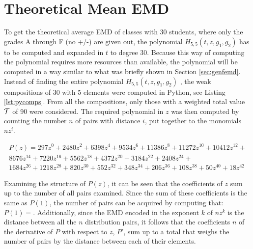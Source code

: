 \documentclass[12pt,letterpaper,oneside,openany]{book}
\begin{document}
\setcounter{section}{2}
\section{Theoretical Mean EMD}

To get the theoretical average EMD of classes with 30 students, where only the grades A through F  (no +/-) are given out, the polynomial $H_{5,5}(t, z, g_1, g_2)$ has to be computed and expanded in $t$ to degree 30. Because this way of computing the polynomial requires more resources than available, the polynomial will be computed in a way similar to what was briefly shown in Section \ref{sec:genfemd}.
Instead of finding the entire polynomial $H_{5,5}(t, z, g_1, g_2)$ , the weak compositions of 30 with 5 elements were computed in Python, see Listing \ref{lst:pycomps}. From all the compositions, only those with a weighted total value ${\mathcal{T}}$ of 90 were considered. The required polynomial in $z$ was then computed by counting the number $n$ of pairs with distance $i$, put together to the monomials $nz^i$.


\begin{multline*}
	P(z)=297z^{0}+2480z^{2}+6398z^{4}+9534z^{6}+11386z^{8}+11272z^{10}+10412z^{12}+\\8676z^{14}+7220z^{16}+5562z^{18}+4372z^{20}+3184z^{22}+2408z^{24}+\\1684z^{26}+1218z^{28}+820z^{30}+552z^{32}+348z^{34}+206z^{36}+108z^{38}+50z^{40}+18z^{42}
\end{multline*}

Examining the structure of $P(z)$, it can be seen that the coefficients of  $z$ sum up to the number of all pairs examined. Since the sum of these coefficients is the same as $P(1)$, the number of pairs can be acquired by computing that: $P(1)=$.
Additionally, since the EMD encoded in the exponent $k$ of $nz^k$ is the distance between all the $n$ distribution pairs, it follows that the coefficients $n$ of the derivative of $P$ with respect to $z$, $P'$, sum up to a total that weighs the number of pairs by the distance between each of their elements.
\end{document}
